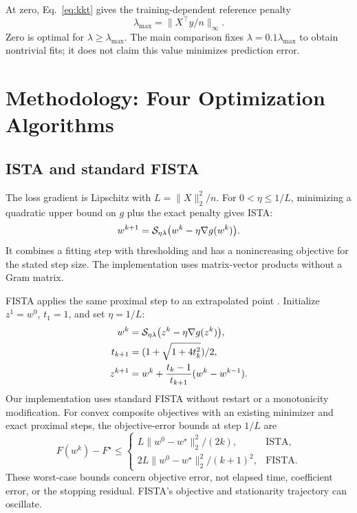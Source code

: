 \documentclass[10pt,letterpaper]{article}
\begin{document}
At zero, Eq.~\eqref{eq:kkt} gives the training-dependent reference penalty
\begin{equation}
 \lambda_{\max}=\|X^\top y/n\|_\infty.
 \label{eq:lmax}
\end{equation}
Zero is optimal for $\lambda\geq\lambda_{\max}$. The main comparison fixes $\lambda=0.1\lambda_{\max}$ to obtain nontrivial fits; it does not claim this value minimizes prediction error.

\section{Methodology: Four Optimization Algorithms}
\subsection{ISTA and standard FISTA}
The loss gradient is Lipschitz with $L=\|X\|_2^2/n$. For $0<\eta\leq1/L$, minimizing a quadratic upper bound on $g$ plus the exact penalty gives ISTA:
\begin{equation}
 w^{k+1}=\mathcal{S}_{\eta\lambda}\bigl(w^k-\eta\nabla g(w^k)\bigr).
 \label{eq:ista}
\end{equation}
It combines a fitting step with thresholding and has a nonincreasing objective for the stated step size. The implementation uses matrix-vector products without a Gram matrix.

FISTA applies the same proximal step to an extrapolated point \citep{beck2009}. Initialize $z^1=w^0$, $t_1=1$, and set $\eta=1/L$:
\begin{align}
 w^k&=\mathcal{S}_{\eta\lambda}\bigl(z^k-\eta\nabla g(z^k)\bigr),\\
 t_{k+1}&=(1+\sqrt{1+4t_k^2})/2,\\
 z^{k+1}&=w^k+\frac{t_k-1}{t_{k+1}}(w^k-w^{k-1}).
 \label{eq:fista}
\end{align}
Our implementation uses standard FISTA without restart or a monotonicity modification. For convex composite objectives with an existing minimizer and exact proximal steps, the objective-error bounds at step $1/L$ are
\begin{equation}
 F(w^k)-F^\star\leq
 \begin{cases}
 L\|w^0-w^\star\|_2^2/(2k),&\text{ISTA},\\
 2L\|w^0-w^\star\|_2^2/(k+1)^2,&\text{FISTA}.
 \end{cases}
 \label{eq:rates}
\end{equation}
These worst-case bounds concern objective error, not elapsed time, coefficient error, or the stopping residual. FISTA's objective and stationarity trajectory can oscillate.
\end{document}

